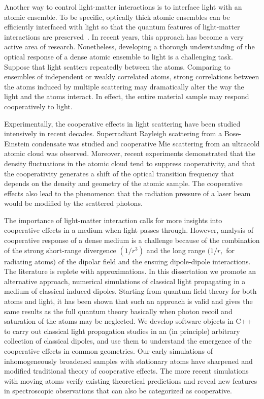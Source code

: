 Another way to control light-matter interactions is to interface light with an atomic ensemble. To be specific,  optically thick atomic ensembles can be efficiently interfaced with light so that the quantum features of light-matter interactions are preserved~\cite{RevModPhys.82.1041}. In recent years, this approach has become a very active area of research. Nonetheless, developing a thorough understanding of the optical response of a dense atomic ensemble to light is a challenging task. Suppose that light scatters repeatedly  between the atoms. Comparing to ensembles of independent or weakly correlated atoms, strong correlations between the atoms induced by multiple scattering may dramatically alter the way the light and the atoms interact.  In effect, the entire material sample may respond cooperatively to light.

Experimentally, the cooperative effects in light scattering have been studied intensively in recent decades.  Superradiant Rayleigh scattering from a Bose-Einstein condensate was studied\cite{Inouye23071999,PhysRevLett.83.5202,PhysRevA.62.063615} and cooperative Mie scattering from an ultracold atomic cloud was observed\cite{PhysRevA.82.011404}. Moreover, recent experiments demonstrated that the density fluctuations in the atomic cloud tend to suppress cooperativity\cite{PhysRevLett.104.183602}, and that the cooperativity generates a shift of the optical transition frequency that depends on the density and geometry of the atomic sample\cite{PhysRevLett.108.173601}. The cooperative effects also lead to the phenomenon that the radiation pressure of a laser beam would be modified by the scattered photons\cite{Eur.Phys.J.D.58.1}.

The importance of light-matter interaction calls for more insights into cooperative effects in a medium when light passes through. However, analysis of cooperative response of a dense medium is a challenge because of the combination of the strong short-range divergence $(1/r^3)$ and the long range $(1/r, $ for radiating atoms$)$ of the dipolar field and the ensuing dipole-dipole interactions. The literature is replete with approximations\cite{FRIEDBERG1973101}. In this dissertation we promote an alternative approach, numerical simulations of classical light propagating in a medium of classical induced dipoles. Starting from quantum field theory for both atoms and light, it has been shown\cite{PhysRevA.55.513} that such an approach is valid and gives the same results as the full quantum theory basically when photon recoil and saturation of the atoms may be neglected. We develop software objects in C++ to carry out classical light propagation studies in an (in principle) arbitrary collection of classical dipoles, and use them to understand the emergence of the cooperative effects in common geometries. Our early simulations of inhomogeneously broadened samples with stationary atoms have sharpened and modified traditional theory of cooperative effects. The more recent simulations with moving atoms verify existing theoretical predictions and reveal new features in spectroscopic observations that can also be categorized as cooperative.


